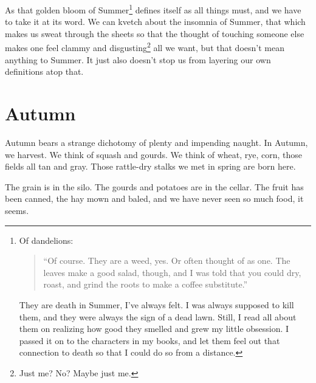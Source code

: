 \documentclass[12pt,oneside]{memoir}
\begin{document}
As that golden bloom of Summer\footnote{Of dandelions:\begin{quote}``Of course. They are a weed, yes. Or often thought of as one. The leaves make a good salad, though, and I was told that you could dry, roast, and grind the roots to make a coffee substitute.''\par
\parencite[161]{toledot}\end{quote}\par
They are death in Summer, I've always felt. I was always supposed to kill them, and they were always the sign of a dead lawn. Still, I read all about them on realizing how good they smelled and grew my little obsession. I passed it on to the characters in my books, and let them feel out that connection to death so that I could do so from a distance.} defines itself as all things must, and we have to take it at its word. We can kvetch about the insomnia of Summer, that which makes us sweat through the sheets so that the thought of touching someone else makes one feel clammy and disgusting\footnote{Just me? No? Maybe just me.} all we want, but that doesn't mean anything to Summer. It just also doesn't stop us from layering our own definitions atop that.


\clearpage

\section*{Autumn}

Autumn bears a strange dichotomy of plenty and impending naught. In Autumn, we harvest. We think of squash and gourds. We think of wheat, rye, corn, those fields all tan and gray. Those rattle-dry stalks we met in spring are born here.

The grain is in the silo. The gourds and potatoes are in the cellar. The fruit has been canned, the hay mown and baled, and we have never seen so much food, it seems.
\end{document}
